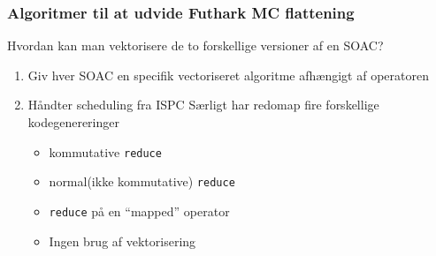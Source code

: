 \documentclass[t]{beamer}
\begin{document}

\begin{frame}
  \frametitle{Algoritmer til at udvide Futhark MC flattening}
  Hvordan kan man vektorisere de to forskellige versioner af en SOAC?
  \begin{enumerate}
  \item Giv hver SOAC en specifik vectoriseret algoritme afhængigt af operatoren
  \item Håndter scheduling fra ISPC
  Særligt har redomap fire forskellige kodegenereringer
    \begin{itemize}
    \item kommutative \texttt{reduce}
    \item normal(ikke kommutative) \texttt{reduce}
    \item \texttt{reduce} på en ``mapped'' operator
    \item Ingen brug af vektorisering
    \end{itemize}
  \end{enumerate}
\end{frame}
\end{document}
